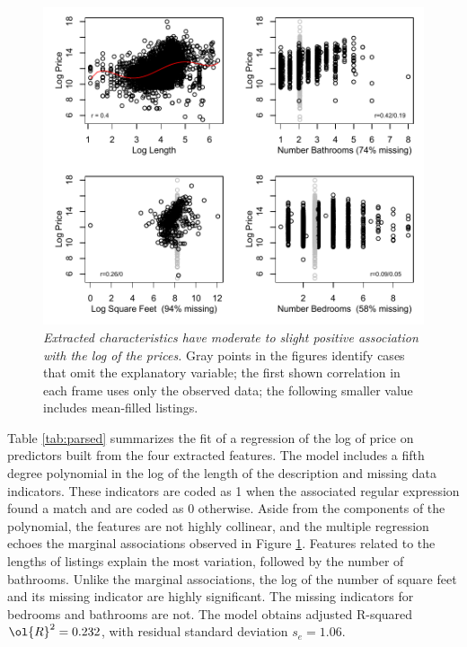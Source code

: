 \documentclass[10pt]{article}
\begin{document}
 \begin{figure}
  \caption{ \label{fig:parsed} { \sl Extracted characteristics have moderate to
 slight positive association with the log of the prices. } Gray points in the
 figures identify cases that omit the explanatory variable; the first shown
 correlation in each frame uses only the observed data; the following smaller 
 value includes mean-filled listings. }
 
\centerline{
 \vspace{0.1in}
 \includegraphics[width=5in]{figures/parsed} }
 \vspace{0.2in}
 \end{figure}


 Table \ref{tab:parsed} summarizes the fit of a regression of the log of price
 on predictors built from the four extracted features. The model includes a
 fifth degree polynomial in the log of the length of the description and missing
 data indicators.  These indicators are coded as 1 when the associated regular
 expression found a match and are coded as 0 otherwise.  Aside from the
 components of the polynomial, the features are not highly collinear, and the
 multiple regression echoes the marginal associations observed in Figure
 \ref{fig:parsed}.  Features related to the lengths of listings explain the most
 variation, followed by the number of bathrooms.  Unlike the marginal
 associations, the log of the number of square feet and its missing indicator
 are highly significant.  The missing indicators for bedrooms and bathrooms are
 not.  The model obtains adjusted R-squared $\ol{R}^2 = 0.232$, with residual
 standard deviation $s_e =1.06$.
\end{document}
